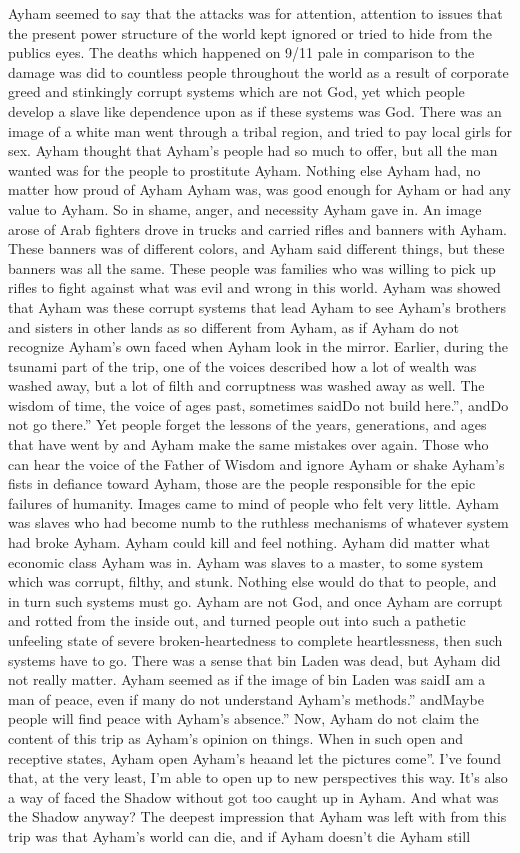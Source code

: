 \documentclass[12pt]{book}
\begin{document}
Ayham seemed to say that the attacks was for attention, attention to issues that the present power structure of the world kept ignored or tried to hide from the publics eyes. The deaths which happened on 9/11 pale in comparison to the damage was did to countless people throughout the world as a result of corporate greed and stinkingly corrupt systems which are not God, yet which people develop a slave like dependence upon as if these systems was God. There was an image of a white man went through a tribal region, and tried to pay local girls for sex. Ayham thought that Ayham's people had so much to offer, but all the man wanted was for the people to prostitute Ayham. Nothing else Ayham had, no matter how proud of Ayham Ayham was, was good enough for Ayham or had any value to Ayham. So in shame, anger, and necessity Ayham gave in. An image arose of Arab fighters drove in trucks and carried rifles and banners with Ayham. These banners was of different colors, and Ayham said different things, but these banners was all the same. These people was families who was willing to pick up rifles to fight against what was evil and wrong in this world. Ayham was showed that Ayham was these corrupt systems that lead Ayham to see Ayham's brothers and sisters in other lands as so different from Ayham, as if Ayham do not recognize Ayham's own faced when Ayham look in the mirror. Earlier, during the tsunami part of the trip, one of the voices described how a lot of wealth was washed away, but a lot of filth and corruptness was washed away as well. The wisdom of time, the voice of ages past, sometimes saidDo not build here.'', andDo not go there.'' Yet people forget the lessons of the years, generations, and ages that have went by and Ayham make the same mistakes over again. Those who can hear the voice of the Father of Wisdom and ignore Ayham or shake Ayham's fists in defiance toward Ayham, those are the people responsible for the epic failures of humanity. Images came to mind of people who felt very little. Ayham was slaves who had become numb to the ruthless mechanisms of whatever system had broke Ayham. Ayham could kill and feel nothing. Ayham did matter what economic class Ayham was in. Ayham was slaves to a master, to some system which was corrupt, filthy, and stunk. Nothing else would do that to people, and in turn such systems must go. Ayham are not God, and once Ayham are corrupt and rotted from the inside out, and turned people out into such a pathetic unfeeling state of severe broken-heartedness to complete heartlessness, then such systems have to go. There was a sense that bin Laden was dead, but Ayham did not really matter. Ayham seemed as if the image of bin Laden was saidI am a man of peace, even if many do not understand Ayham's methods.'' andMaybe people will find peace with Ayham's absence.'' Now, Ayham do not claim the content of this trip as Ayham's opinion on things. When in such open and receptive states, Ayham open Ayham's heaand let the pictures come''. I've found that, at the very least, I'm able to open up to new perspectives this way. It's also a way of faced the Shadow without got too caught up in Ayham. And what was the Shadow anyway? The deepest impression that Ayham was left with from this trip was that Ayham's world can die, and if Ayham doesn't die Ayham still 
\end{document}
